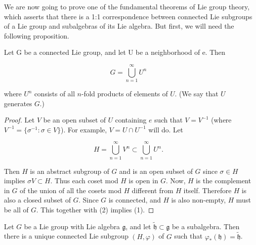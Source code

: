 \begin{definition}
We are now going to prove one of the fundamental theorems of Lie group theory, which asserts that there is a 1:1 correspondence between connected Lie subgroups of a Lie group and subalgebras of its Lie algebra. But first, we will need the following proposition.

\end{definition}

\begin{proposition}\label{thm:3.18}
Let G be a connected Lie group, and let U be a neighborhood of e. Then

\begin{equation}
\tag{1}\label{eq:3.18:1}
G=\bigcup_{n=1}^{\infty}U^{n}
\end{equation}

where $U^{n}$ consists of all $n$-fold products of elements of $U$. (We say that $U$ generates $G$.)

\end{proposition}

\begin{proof}
Let $V$ be an open subset of $U$ containing $e$ such that $V = V^{-1}$ (where $V^{-1} = \{\sigma^{-1}: \sigma \in V\}$). For example, $V = U \cap U^{-1}$ will do. Let

\begin{equation}
\tag{2}\label{eq:3.18:2}
H=\bigcup_{n=1}^{\infty}V^{n}\subset\bigcup_{n=1}^{\infty}U^{n}.
\end{equation}

Then $H$ is an abstract subgroup of $G$ and is an open subset of $G$ since $\sigma \in H$ implies $\sigma V \subset H$. Thus each coset mod $H$ is open in $G$. Now, $H$ is the complement in $G$ of the union of all the cosets mod $H$ different from $H$ itself. Therefore $H$ is also a closed subset of $G$. Since $G$ is connected, and $H$ is also non-empty, $H$ must be all of $G$. This together with (2) implies (1).
\end{proof}

\begin{theorem}\label{thm:3.19}
Let $G$ be a Lie group with Lie algebra $\mathfrak{g}$, and let $\widetilde{\mathfrak{h}} \subset \mathfrak{g}$ be a subalgebra. Then there is a unique connected Lie subgroup $(H, \varphi)$ of $G$ such that $\varphi_{*}(\mathfrak{h}) = \widetilde{\mathfrak{h}}$.

\end{theorem}

